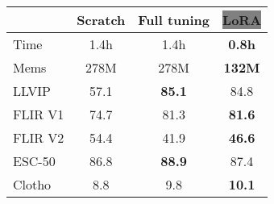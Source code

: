 \documentclass{article} \usepackage{iclr2024_conference,times}
\begin{document}
\begin{table*}[h]
{\begin{minipage}{0.4\linewidth}
{\begin{center}
                    \begin{tabular}{lccc}
                        \toprule
                         & Scratch & Full tuning & \colorbox{Gray}{LoRA} \\ 
                        \midrule
                        Time & 1.4h & 1.4h & \textbf{0.8h} \\ 
                        Mems & 278M & 278M & \textbf{132M} \\ 
LLVIP & 57.1 & \textbf{85.1} & 84.8 \\ 
                        FLIR V1 & 74.7 & 81.3 & \textbf{81.6} \\ 
                        FLIR V2 & 54.4 & 41.9 & \textbf{46.6} \\ 
                        ESC-50 & 86.8 & \textbf{88.9} & 87.4 \\ 
                        Clotho & 8.8 & 9.8 & \textbf{10.1} \\ 
                        \bottomrule
                    \end{tabular}
		\end{center}}\end{minipage}
	}
 

\end{table*}
\end{document}
